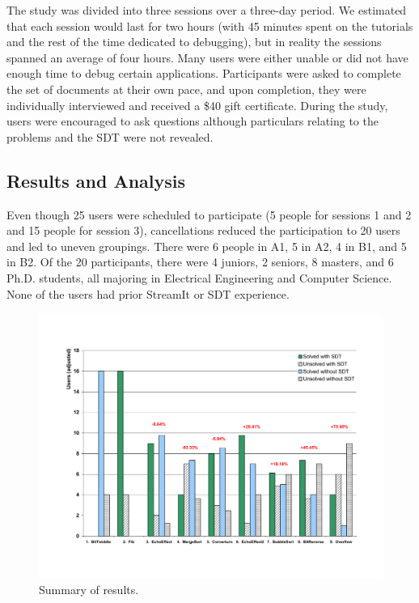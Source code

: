 \documentclass[times, 10pt,twocolumn]{article}
\begin{document}
The study was divided into three sessions over a three-day period.  We
estimated that each session would  last for two hours (with 45 minutes
spent  on  the  tutorials  and  the  rest of  the  time  dedicated  to
debugging), but  in reality  the sessions spanned  an average  of four
hours.  Many users  were either unable or did not  have enough time to
debug certain  applications.  Participants were asked  to complete the
set of  documents at  their own pace,  and upon completion,  they were
individually interviewed and received a \$40 gift certificate.  During
the study, users were encouraged to ask questions although particulars
relating to the problems and the SDT were not revealed.


\subsection{Results and Analysis}

Even though 25  users were  scheduled  to participate  (5 people  for
sessions 1 and  2 and 15 people for  session 3), cancellations reduced
the participation to 20 users  and led to uneven groupings. There were
6 people in A1, 5 in A2, 4 in B1, and 5 in B2. Of the 20 participants,
there were 4 juniors, 2 seniors,  8 masters, and 6 Ph.D. students, all
majoring in Electrical Engineering and Computer Science. None of the
users had prior StreamIt or SDT experience.

\begin{figure}[t]
\begin{center}
  \includegraphics[scale=.70, angle=270]{./users-results.pdf}
  \caption{Summary of results.}
  \label{fig:solutions}
\end{center}
\end{figure}
\end{document}
